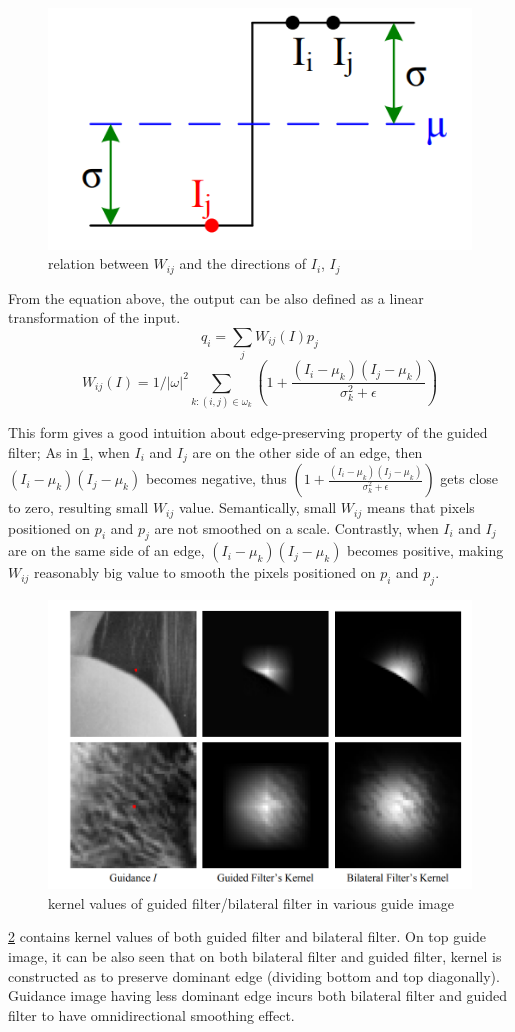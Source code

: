 \documentclass[extendedabs]{bmvc2k}
\begin{document}
\begin{figure}[h]
    \centering
    \includegraphics[width=0.3\linewidth]{hw2_1_3}
    \caption{relation between $W_{ij}$ and the directions of $I_i$, $I_j$}
    \label{fig:3}
\end{figure}

From the equation above, the output can be also defined as a linear transformation of the input.
\[q_i = \sum_{j}W_{ij}(I)p_j\]
\[W_{ij}(I) = 1/|\omega|^2\sum_{k:(i,j) \in \omega_k}(1 + \frac{(I_i - \mu_k)(I_j - \mu_k)}{\sigma_k^2 + \epsilon})\]

This form gives a good intuition about edge-preserving property of the guided filter;
As in \figurename{\ref{fig:3}}, when $I_i$ and $I_j$ are on the other side of an edge, 
then $(I_i-\mu_k)(I_j-\mu_k)$ becomes negative, 
thus $(1 + \frac{(I_i - \mu_k)(I_j - \mu_k)}{\sigma_k^2 + \epsilon})$ gets close to zero,
resulting small $W_{ij}$ value. Semantically, small $W_{ij}$ means that 
pixels positioned on $p_i$ and $p_j$ are not smoothed on a scale.
Contrastly, when $I_i$ and $I_j$ are on the same side
of an edge, $(I_i-\mu_k)(I_j-\mu_k)$ becomes positive, making $W_{ij}$ reasonably big
value to smooth the pixels positioned on $p_i$ and $p_j$.

\begin{figure}[h]
    \centering
    \includegraphics[width=0.8\linewidth]{hw2_1_5}
    \caption{kernel values of guided filter/bilateral filter in various guide image}
    \label{fig:5}
\end{figure}

\figurename{\ref{fig:5}} contains kernel values of both guided filter and bilateral filter.
On top guide image, it can be also seen that on both bilateral filter and guided filter, 
kernel is constructed as to preserve dominant edge (dividing bottom and top diagonally).
Guidance image having less dominant edge incurs both bilateral filter and guided filter
to have omnidirectional smoothing effect.
\end{document}
